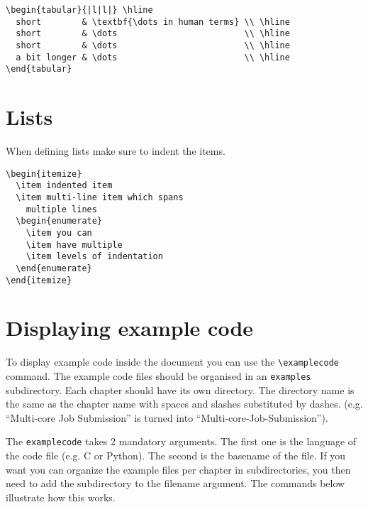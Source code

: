 \documentclass[11pt,a4paper]{article}
\begin{document}
\begin{verbatim}
\begin{tabular}{|l|l|} \hline
  short        & \textbf{\dots in human terms} \\ \hline
  short        & \dots                         \\ \hline
  short        & \dots                         \\ \hline
  a bit longer & \dots                         \\ \hline
\end{tabular}
\end{verbatim}

\section{Lists}
\label{sec:lists}

When defining lists make sure to indent the items.

\begin{verbatim}
\begin{itemize}
  \item indented item
  \item multi-line item which spans
    multiple lines
  \begin{enumerate}
    \item you can
    \item have multiple
    \item levels of indentation
  \end{enumerate}
\end{itemize}
\end{verbatim}

\section{Displaying example code}
\label{sec:displaying-example-code}

To display example code inside the document you can use the \verb|\examplecode|
command. The example code files should be organised in an \verb|examples|
subdirectory.  Each chapter should have its own directory. The directory name
is the same as the chapter name with spaces and slashes substituted by dashes.
(e.g. ``Multi-core Job Submission'' is turned into
``Multi-core-Job-Submission'').

The \verb|examplecode| takes 2 mandatory arguments. The first one is the
language of the code file (e.g. C or Python). The second is the basename of the
file. If you want you can organize the example files per chapter in
subdirectories, you then need to add the subdirectory to the filename argument.
The commands below illustrate how this works.
\end{document}

